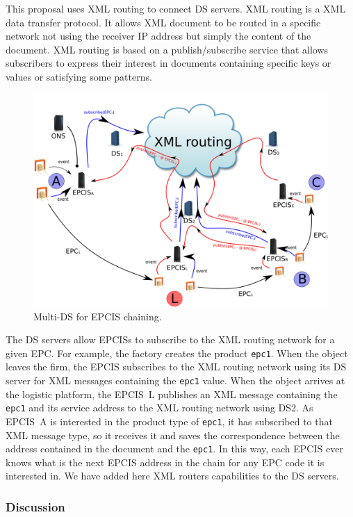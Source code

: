\documentclass[a4paper]{llncs}
\begin{document}
This proposal uses XML routing to connect DS servers. XML routing is a XML data transfer protocol.
It allows XML document to be routed in a specific network not using the receiver IP address but
simply the content of the document. XML routing is based on a publish/subscribe service that allows
subscribers to express their interest in documents containing specific keys or values or satisfying
some patterns.

\begin{figure}[htb]
\center
\includegraphics[width=.9\textwidth]{img/xmlrouting.png}
\caption{Multi-DS for EPCIS chaining.}
\label{epcischaining}
\end{figure}

The DS servers allow EPCISs to subscribe to the XML routing network for a given EPC. For example,
the factory creates the product \texttt{epc1}. When the object leaves the firm, the EPCIS subscribes
to the XML routing network using its DS server for XML messages containing the \texttt{epc1} value.
When the object arrives at the logistic platform, the EPCIS~L publishes an XML message containing
the \texttt{epc1} and its service address to the XML routing network using DS2. As EPCIS~A is
interested in the product type of \texttt{epc1}, it has subscribed to that XML message type, so it
receives it and saves the correspondence between the address contained in the document and the
\texttt{epc1}. In this way, each EPCIS ever knows what is the next EPCIS address in the chain for
any EPC code it is interested in. We have added here XML routers capabilities to the DS servers.

\subsubsection{Discussion}
\end{document}
